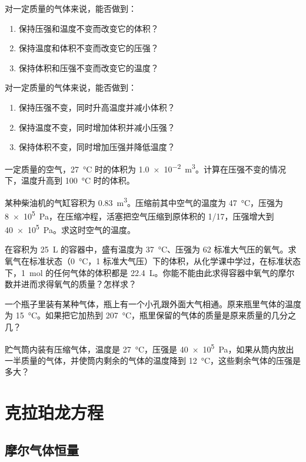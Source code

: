 \begin{Practice}
\begin{question}
	\item 对一定质量的气体来说，能否做到：
	\begin{enumerate}
		\item	保持压强和温度不变而改变它的体积？
		\item	保持温度和体积不变而改变它的压强？
		\item	保持体积和压强不变而改变它的温度？	 
	\end{enumerate}
	\item  对一定质量的气体来说，能否做到：
	\begin{enumerate}
		\item 保持压强不变，同时升高温度并减小体积？
		\item 保持温度不变，同时增加体积并减小压强？
		\item 保持体积不变，同时增加压强并降低温度？
	\end{enumerate}
	\item  一定质量的空气，\qty{27}{\celsius} 时的体积为 \qty{1.0e-2}{m^3}。计算在压强不变的情况下，温度升高到 \qty{100}{\celsius} 时的体积。
	\item  某种柴油机的气缸容积为 \qty{0.83}{m^3}。压缩前其中空气的温度为 \qty{47}{\celsius}，压强为 \qty{8e5}{Pa}，在压缩冲程，活塞把空气压缩到原体积的 1/17，压强增大到 \qty{40e5}{Pa}。求这时空气的温度。
	\item  在容积为 \qty{25}{L} 的容器中，盛有温度为 \qty{37}{\celsius}、压强为 62 标准大气压的氧气。求氧气在标准状态（\qty{0}{\celsius}，1 标准大气压）下的体积，从化学课中学过，在标准状态下，\qty{1}{mol} 的任何气体的体积都是 \qty{22.4}{L}。你能不能由此求得容器中氧气的摩尔数并进而求得氧气的质量？怎样求？
	\item  一个瓶子里装有某种气体，瓶上有一个小孔跟外面大气相通。原来瓶里气体的温度为 \qty{15}{\celsius}。如果把它加热到 \qty{207}{\celsius}，瓶里保留的气体的质量是原来质量的几分之几？
	\item  贮气筒内装有压缩气体，温度是 \qty{27}{\celsius}，压强是 \qty{40e5}{Pa}，如果从筒内放出一半质量的气体，并使筒内剩余的气体的温度降到 \qty{12}{\celsius}，这些剩余气体的压强是多大？
\end{question}
\end{Practice}


\section{克拉珀龙方程}
\subsection{摩尔气体恒量} 

